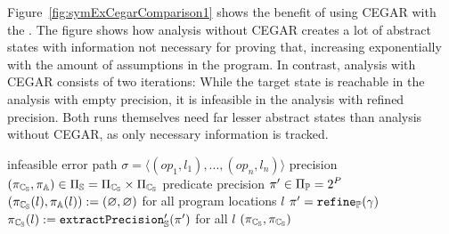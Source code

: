 Figure~\ref{fig:symExCegarComparison1} shows the benefit of using CEGAR with the \symbolicExecutionCPA.
The figure shows how analysis without CEGAR creates a lot of abstract states with information not necessary for proving that, increasing exponentially with the amount of assumptions in the program.
In contrast, analysis with CEGAR consists of two iterations: While the target state is reachable in the analysis with empty precision, it is infeasible in the analysis with refined precision.
Both runs themselves need far lesser abstract states than analysis without CEGAR, as only necessary information is tracked.

\begin{algorithm}[t!]
\caption{$\refineSymbolicPred{\sigma}$}
\label{alg:refineSym2}
\begin{algorithmic}[1]
\Input infeasible error path $\sigma = \langle (op_1, l_1), ..., (op_n, l_n) \rangle$
\Output precision $(\pi_{\mathbb{C_{S}}}, \pi_{\mathbb{A}}) \in \Pi_{\mathbb{S}} = \Pi_{\mathbb{C_{S}}} \times \Pi_{\mathbb{C_{S}}}$
\Variables predicate precision $\pi' \in \Pi_{\mathbb{P}} = 2^P$
\State $(\pi_{\mathbb{C_{S}}}(l), \pi_{\mathbb{A}}(l)) := (\varnothing, \varnothing)$ for all program locations $l$
\State $\pi' = \texttt{refine}_{\mathbb{P}}(\gamma)$
\State $\pi_{\mathbb{C_{S}}}(l) := \texttt{extractPrecision}'_{\mathbb{S}}(\pi')$ for all $l$
\State %
\Return $(\pi_{\mathbb{C_{S}}}, \pi_{\mathbb{C_{S}}})$
\end{algorithmic}
\end{algorithm}

